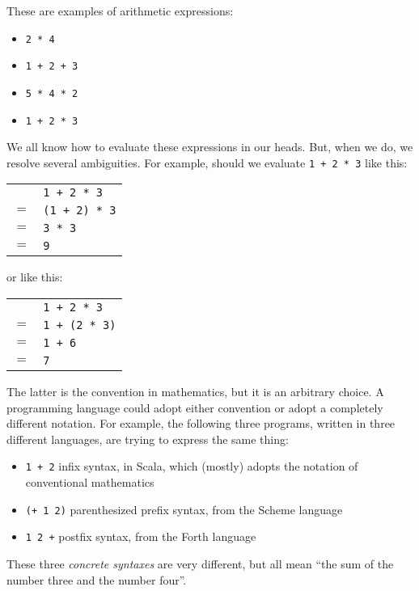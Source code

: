 \documentclass[9pt]{extbook}
\begin{document}
These are examples of arithmetic expressions:

\begin{itemize}

\item \verb|2 * 4|

\item \verb|1 + 2 + 3|

\item \verb|5 * 4 * 2|

\item \verb|1 + 2 * 3|

\end{itemize}
%

We all know how to evaluate these expressions in our heads. But, when we do,
we resolve several ambiguities. For example, should we evaluate \verb|1 + 2 * 3|
like this:

\begin{tabular}{ll}
& \verb|1 + 2 * 3| \\
$=$ & \verb|(1 + 2) * 3| \\
$=$ & \verb|3 * 3| \\
$=$ & \verb|9|
\end{tabular}

\noindent or like this:

\begin{tabular}{ll}
& \verb|1 + 2 * 3| \\
$=$ & \verb|1 + (2 * 3)| \\
$=$ & \verb|1 + 6| \\
$=$ & \verb|7|
\end{tabular}

The latter is the convention in mathematics, but it is an arbitrary choice.
A programming language could adopt either convention or adopt a completely
different notation. For example, the following three programs, written
in three different languages, are trying to express the same thing:
%
\begin{itemize}

\item \verb|1 + 2| infix syntax, in Scala, which (mostly) adopts the notation of
   conventional mathematics

\item \verb|(+ 1 2)| parenthesized prefix syntax, from the Scheme language

\item \verb|1 2 +| postfix syntax, from the Forth language

\end{itemize}
%
These three \emph{concrete syntaxes} are very different, but all mean
``the sum of the number three and the number four''.
\end{document}
